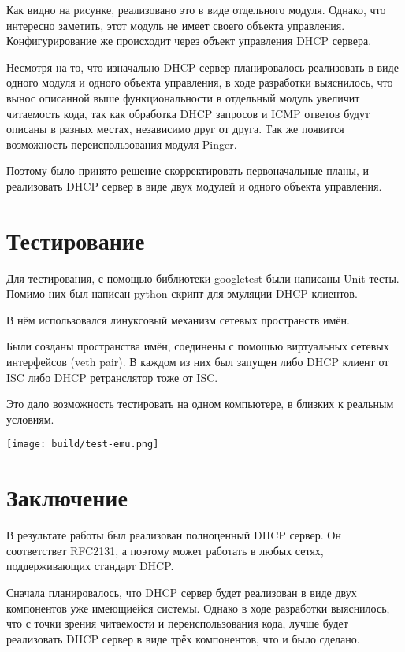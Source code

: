 \documentclass[14pt,a4paper]{extarticle}
\begin{document}
Как видно на рисунке, реализовано это в виде отдельного модуля. Однако, что интересно заметить, этот модуль не имеет своего объекта управления. Конфигурирование же происходит через объект управления DHCP сервера.

Несмотря на то, что изначально DHCP сервер планировалось реализовать в виде одного модуля и одного объекта управления, в ходе разработки выяснилось, что вынос описанной выше функциональности в отдельный модуль увеличит читаемость кода, так как обработка DHCP запросов и ICMP ответов будут описаны в разных местах, независимо друг от друга. Так же появится возможность переиспользования модуля Pinger.

Поэтому было принято решение скорректировать первоначальные планы, и реализовать DHCP сервер в виде двух модулей и одного объекта управления.

\pagebreak
\section{Тестирование}

Для тестирования, с помощью библиотеки googletest были написаны Unit-тесты.
Помимо них был написан python скрипт для эмуляции DHCP клиентов.

В нём использовался линуксовый механизм сетевых пространств имён.

Были созданы пространства имён, соединены с помощью виртуальных сетевых интерфейсов (veth pair). В каждом из них был запущен либо DHCP клиент от ISC либо DHCP ретранслятор тоже от ISC.

Это дало возможность тестировать на одном компьютере, в близких к реальным условиям.

\texttt{[image: build/test-emu.png]}

\pagebreak
\section*{Заключение}

В результате работы был реализован полноценный DHCP сервер.
Он соответствет RFC2131, а поэтому может работать в любых сетях, поддерживающих стандарт DHCP.

Сначала планировалось, что DHCP сервер будет реализован в виде двух компонентов уже имеющиейся системы. Однако в ходе разработки выяснилось, что с точки зрения читаемости и переиспользования кода, лучше будет реализовать DHCP сервер в виде трёх компонентов, что и было сделано.
\end{document}
